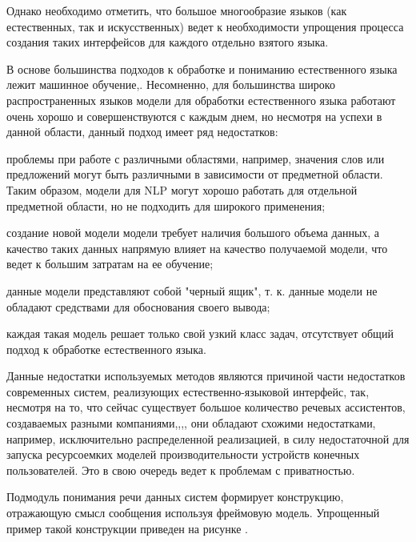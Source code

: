Однако необходимо отметить, что большое многообразие языков (как естественных, так и искусственных) ведет к необходимости упрощения процесса создания таких интерфейсов для каждого отдельно взятого языка.

В основе большинства подходов к обработке и пониманию естественного языка лежит машинное обучение,. Несомненно, для большинства широко распространенных языков модели для обработки естественного языка работают очень хорошо и совершенствуются с каждым днем, но несмотря на успехи в данной области, данный подход имеет ряд недостатков:
\begin{textitemize}
    \item проблемы при работе с различными областями, например, значения слов или предложений могут быть различными в зависимости от предметной области. Таким образом, модели для NLP могут хорошо работать для отдельной предметной области, но не подходить для широкого применения;
    \item создание новой модели модели требует наличия большого объема данных, а качество таких данных напрямую влияет на качество получаемой модели, что ведет к большим затратам на ее обучение;
    \item данные модели представляют собой "черный ящик"{}, т. к. данные модели не обладают средствами для обоснования своего вывода;
    \item каждая такая модель решает только свой узкий класс задач, отсутствует общий подход к обработке естественного языка.
\end{textitemize}

Данные недостатки используемых методов являются причиной части недостатков современных систем, реализующих естественно-языковой интерфейс, так, несмотря на то, что сейчас существует большое количество речевых ассистентов, создаваемых разными компаниями,,,, они обладают схожими недостатками, например, исключительно распределенной реализацией, в силу недостаточной для запуска ресурсоемких моделей производительности устройств конечных пользователей. Это в свою очередь ведет к проблемам с приватностью.

Подмодуль понимания речи данных систем формирует конструкцию, отражающую смысл сообщения используя фреймовую модель. Упрощенный пример такой конструкции приведен на рисунке \textit{}.

